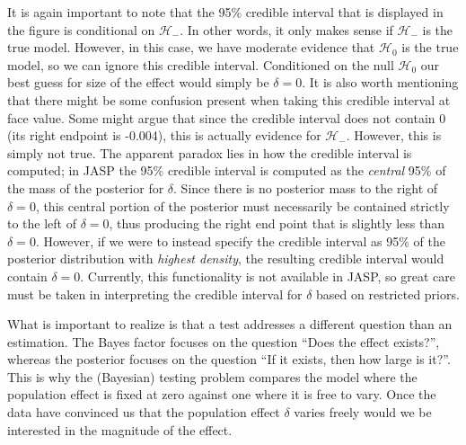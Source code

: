 \documentclass[english,,doc,floatsintext]{apa6}
\begin{document}
It is again important to note that the 95\% credible interval that is displayed in the figure is conditional on \(\mathcal{H}_{-}\). In other words, it only makes sense if \(\mathcal{H}_{-}\) is the true model. However, in this case, we have moderate evidence that \(\mathcal{H}_{0}\) is the true model, so we can ignore this credible interval. Conditioned on the null \(\mathcal{H}_{0}\) our best guess for size of the effect would simply be \(\delta = 0\). It is also worth mentioning that there might be some confusion present when taking this credible interval at face value. Some might argue that since the credible interval does not contain 0 (its right endpoint is -0.004), this is actually evidence for \(\mathcal{H}_{-}\). However, this is simply not true. The apparent paradox lies in how the credible interval is computed; in JASP the 95\% credible interval is computed as the \emph{central} 95\% of the mass of the posterior for \(\delta\). Since there is no posterior mass to the right of \(\delta=0\), this central portion of the posterior must necessarily be contained strictly to the left of \(\delta=0\), thus producing the right end point that is slightly less than \(\delta=0\). However, if we were to instead specify the credible interval as 95\% of the posterior distribution with \emph{highest density}, the resulting credible interval would contain \(\delta=0\). Currently, this functionality is not available in JASP, so great care must be taken in interpreting the credible interval for \(\delta\) based on restricted priors.

What is important to realize is that a test addresses a different question than an estimation. The Bayes factor focuses on the question \enquote{Does the effect exists?}, whereas the posterior focuses on the question \enquote{If it exists, then how large is it?}. This is why the (Bayesian) testing problem compares the model where the population effect is fixed at zero against one where it is free to vary. Once the data have convinced us that the population effect \(\delta\) varies freely would we be interested in the magnitude of the effect.
\end{document}
